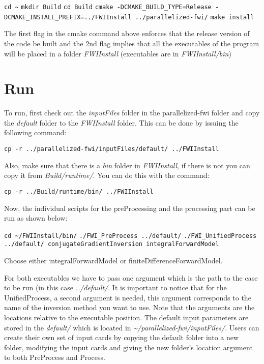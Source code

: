 \documentclass[10pt]{article}
\begin{document}
\texttt{cd \textasciitilde}
\newline
\texttt{mkdir Build}
\newline
\texttt{cd Build}
\newline
\texttt{cmake -DCMAKE\_BUILD\_TYPE=Release -DCMAKE\_INSTALL\_PREFIX=../FWIInstall ../parallelized-fwi/}
\newline
\texttt{make install} 
\newline

\noindent The first flag in the cmake command above enforces that the release version of the code be built and the 2nd flag implies that all the executables of the program will be placed in a folder \textit{FWIInstall} (executables are in \textit{FWIInstall/bin})

\section{Run}
To run, first check out the \textit{inputFiles} folder in the parallelized-fwi folder and copy the \textit{default} folder to the \textit{FWIInstall} folder. This can be done by issuing the following command: 
\newline

\texttt{cp -r ../parallelized-fwi/inputFiles/default/ ../FWIInstall} 
\newline

Also, make sure that there is a \textit{bin} folder in \textit{FWIInstall}, if there is not you can copy it from \textit{Build/runtime/}. You can do this with the command: 
\newline

\texttt{cp -r ../Build/runtime/bin/ ../FWIInstall} 
\newline

Now, the individual scripts for the preProcessing and the processing part can be run as shown below: \newline

\texttt{cd \textasciitilde/FWIInstall/bin/} \newline
\texttt{./FWI\_PreProcess ../default/} \newline
\texttt{./FWI\_UnifiedProcess ../default/ conjugateGradientInversion integralForwardModel}
\newline

Choose either integralForwardModel or finiteDifferenceForwardModel.
\newline

\noindent For both executables we have to pass one argument which is the path to the case to be run (in this case \textit{../default/}. It is important to notice that for the UnifiedProcess, a second argument is needed, this argument corresponds to the name of the inversion method you want to use. Note that the arguments are the locations relative to the executable position. The default input parameters are stored in the \textit{default/} which is located in \textit{\textasciitilde/parallelized-fwi/inputFiles/}. Users can create their own set of input cards by copying the default folder into a new folder, modifying the input cards and giving the new folder's location argument to both PreProcess and Process.\\
\end{document}
